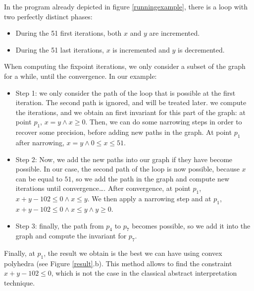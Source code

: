\documentclass[a4paper,english,titlepage,11pt]{report}
\begin{document}
In the program already depicted in figure \ref{runningexample}, there is a loop
with two perfectly distinct phases:
\begin{itemize}
\item During the 51 first iterations, both $x$ and $y$ are incremented.
\item During the 51 last iterations, $x$ is incremented and $y$ is decremented.
\end{itemize}

When computing the fixpoint iterations, we only consider a subset of the graph
for a while, until the convergence. In our example:
\begin{itemize}
\item Step 1:
	we only consider the path of
	the loop that is possible at the first iteration. The second path is
	ignored, and will be treated later. we compute the iterations, and we obtain
	an first invariant for this part of the graph: at point $p_1$, $x =
	y \wedge x \geq 0$.
	Then, we can do some
	narrowing steps in order to recover some precision, before adding new paths
	in the graph. At point $p_1$ after narrowing, $x=y \wedge 0 \leq x \leq 51$.
\item Step 2:
	Now, we add the new paths into our graph if they have become possible. In
	our case, the second path of the loop is now possible, because $x$ can be
	equal to $51$, so we add the path in
	the graph and compute new iterations until convergence\dots. After
	convergence, at point $p_1$, $x + y - 102 \leq 0 \wedge x
	\leq y$. We then apply a narrowing step and at $p_1$, 
$x + y - 102 \leq 0 \wedge x \leq y \wedge y \geq 0$.
\item Step 3: finally, the path from $p_4$ to $p_7$ becomes possible, so we add
it into the graph and compute the invariant for $p_7$.
\end{itemize}

Finally, at $p_1$, the result we obtain is the best we can have using convex
polyhedra (see Figure \ref{result}.b). This method allows to find the
constraint $x + y - 102 \leq 0$, which is not the case in the classical abstract
interpretation technique.
\end{document}
